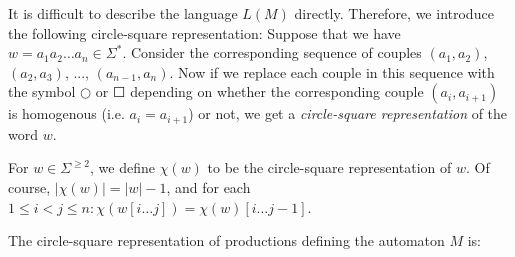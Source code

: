 It is difficult to describe the language $L(M)$ directly. Therefore, we introduce the following circle-square representation: Suppose that we have $w = a_1 a_2 \ldots a_n \in \Sigma^*$. Consider the corresponding sequence of couples $(a_1, a_2)$, $(a_2, a_3)$, ..., $(a_{n-1}, a_n)$. Now if we replace each couple in this sequence with the symbol $\Circle$ or $\Square$ depending on whether the corresponding couple $(a_i, a_{i+1})$ is homogenous (i.e. $a_i = a_{i+1}$) or not, we get a \emph{circle-square representation} of the word $w$.

For $w \in \Sigma^{\ge 2}$, we define $\chi(w)$ to be the circle-square representation of $w$. Of course, $|\chi(w)| = |w| - 1$, and for each $1 \le i < j \le n: \chi(w[i \ldots j]) = \chi(w)[i \ldots j - 1]$.

The circle-square representation of productions defining the automaton $M$ is:

